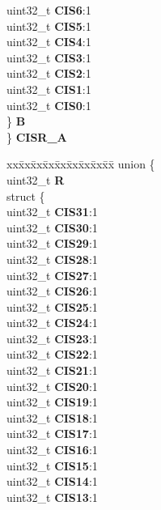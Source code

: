 \begin{DoxyCompactItemize}
\begin{tabbing}
\>\>uint32\_t {\bfseries CIS6}:1\\
\>\>uint32\_t {\bfseries CIS5}:1\\
\>\>uint32\_t {\bfseries CIS4}:1\\
\>\>uint32\_t {\bfseries CIS3}:1\\
\>\>uint32\_t {\bfseries CIS2}:1\\
\>\>uint32\_t {\bfseries CIS1}:1\\
\>\>uint32\_t {\bfseries CIS0}:1\\
\>\} {\bfseries B}\\
\} {\bfseries CISR\_A}\\

\end{tabbing}\item 
\mbox{\label{structETPU__tag_addb021153d41d07925e459d5f02a8aa7}} 
\begin{tabbing}
xx\=xx\=xx\=xx\=xx\=xx\=xx\=xx\=xx\=\kill
union \{\\
\>uint32\_t {\bfseries R}\\
\>struct \{\\
\>\>uint32\_t {\bfseries CIS31}:1\\
\>\>uint32\_t {\bfseries CIS30}:1\\
\>\>uint32\_t {\bfseries CIS29}:1\\
\>\>uint32\_t {\bfseries CIS28}:1\\
\>\>uint32\_t {\bfseries CIS27}:1\\
\>\>uint32\_t {\bfseries CIS26}:1\\
\>\>uint32\_t {\bfseries CIS25}:1\\
\>\>uint32\_t {\bfseries CIS24}:1\\
\>\>uint32\_t {\bfseries CIS23}:1\\
\>\>uint32\_t {\bfseries CIS22}:1\\
\>\>uint32\_t {\bfseries CIS21}:1\\
\>\>uint32\_t {\bfseries CIS20}:1\\
\>\>uint32\_t {\bfseries CIS19}:1\\
\>\>uint32\_t {\bfseries CIS18}:1\\
\>\>uint32\_t {\bfseries CIS17}:1\\
\>\>uint32\_t {\bfseries CIS16}:1\\
\>\>uint32\_t {\bfseries CIS15}:1\\
\>\>uint32\_t {\bfseries CIS14}:1\\
\>\>uint32\_t {\bfseries CIS13}:1\\

\end{tabbing}
\end{DoxyCompactItemize}
